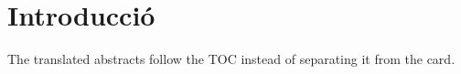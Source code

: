 \documentclass[CAT,TFG,MEM,no-cover,toc]{P3CTeX}
\begin{document}
\chapter{Introducció}
The translated abstracts follow the TOC instead of separating it from the card.
\end{document}
